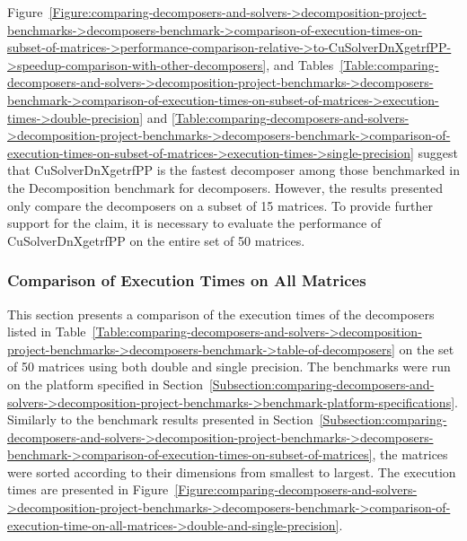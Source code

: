 Figure~\ref{Figure:comparing-decomposers-and-solvers->decomposition-project-benchmarks->decomposers-benchmark->comparison-of-execution-times-on-subset-of-matrices->performance-comparison-relative->to-CuSolverDnXgetrfPP->speedup-comparison-with-other-decomposers}, and Tables~\ref{Table:comparing-decomposers-and-solvers->decomposition-project-benchmarks->decomposers-benchmark->comparison-of-execution-times-on-subset-of-matrices->execution-times->double-precision} and \ref{Table:comparing-decomposers-and-solvers->decomposition-project-benchmarks->decomposers-benchmark->comparison-of-execution-times-on-subset-of-matrices->execution-times->single-precision} suggest that CuSolverDnXgetrfPP is the fastest decomposer among those benchmarked in the Decomposition benchmark for decomposers.
However, the results presented only compare the decomposers on a subset of 15 matrices.
To provide further support for the claim, it is necessary to evaluate the performance of CuSolverDnXgetrfPP on the entire set of 50 matrices.


\subsubsection{Comparison of Execution Times on All Matrices}
This section presents a comparison of the execution times of the decomposers listed in Table~\ref{Table:comparing-decomposers-and-solvers->decomposition-project-benchmarks->decomposers-benchmark->table-of-decomposers} on the set of 50 matrices using both double and single precision.
The benchmarks were run on the platform specified in Section~\ref{Subsection:comparing-decomposers-and-solvers->decomposition-project-benchmarks->benchmark-platform-specifications}.
Similarly to the benchmark results presented in Section~\ref{Subsection:comparing-decomposers-and-solvers->decomposition-project-benchmarks->decomposers-benchmark->comparison-of-execution-times-on-subset-of-matrices}, the matrices were sorted according to their dimensions from smallest to largest.
The execution times are presented in Figure~\ref{Figure:comparing-decomposers-and-solvers->decomposition-project-benchmarks->decomposers-benchmark->comparison-of-execution-time-on-all-matrices->double-and-single-precision}.

